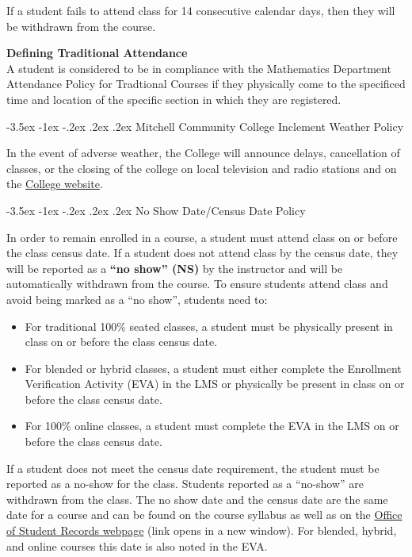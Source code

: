 \documentclass[11pt]{article}
\makeatletter
\renewcommand\section{\@startsection{section}{1}{0pt}%
  {-3.5ex \@plus -1ex \@minus -.2ex}%
  {.2ex \@plus.2ex}%
  {\normalfont\Large\bfseries}} %
\renewenvironment{framed}[1][]{%
  \def\FrameCommand{%
    \hspace{1pt}%
    {\color{mybordercolor}\vrule width 2pt} %
    \hspace{1pt}%
    \fboxsep=\FrameSep%
    \colorbox{mybgcolor}%
  }%
  \MakeFramed {\advance\hsize-\width \FrameRestore}%
}{%
  \endMakeFramed
}
\makeatother
\begin{document}
If a student fails to attend class for 14 consecutive calendar days, then they will be withdrawn from the course.

\begin{framed}
\textbf{Defining Traditional Attendance}\\
A student is considered to be in compliance with the Mathematics Department Attendance Policy for Tradtional Courses if they physically come to the specificed time and location of the specific section in which they are registered.
\end{framed}

\section{Mitchell Community College Inclement Weather Policy}

In the event of adverse weather, the College will announce delays, cancellation of classes, or the closing of the college on local television and radio stations and on the \href{https://www.mitchellcc.edu}{College website}.

\section{No Show Date/Census Date Policy}

In order to remain enrolled in a course, a student must attend class on or before the class census date. If a student does not attend class by the census date, they will be reported as a \textbf{``no show'' (NS)} by the instructor and will be automatically withdrawn from the course.  To ensure students attend class and avoid being marked as a ``no show'', students need to:

\begin{itemize}
\item For traditional 100\% seated classes, a student must be physically present in class on or before the class census date.


\item For blended or hybrid classes, a student must either complete the Enrollment Verification Activity (EVA) in the LMS or physically be present in class on or before the class census date.


\item For 100\% online classes, a student must complete the EVA in the LMS on or before the class census date.
\end{itemize}

If a student does not meet the census date requirement, the student must be reported as a no-show for the class. Students reported as a ``no-show'' are withdrawn from the class.  The no show date and the census date are the same date for a course and can be found on the course syllabus as well as on the \href{https://mitchellcc.edu/office-student-records}{Office of Student Records webpage} (link opens in a new window). For blended, hybrid, and online courses this date is also noted in the EVA.
\end{document}
